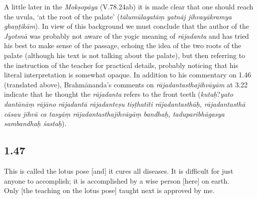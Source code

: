 \begin{ekdosis}
\begin{philcomm}[hp01_045]
A little later in the \emph{Mokṣopāya} (V.78.24ab) it is made clear that one should reach the uvula, `at the root of the palate' (\emph{tālumūlagatāṃ yatnāj jihvayākramya ghaṇṭikām}). In view of this background we must conclude that the author of the \emph{Jyotsnā} was probably not aware of the yogic meaning of \emph{rājadanta} and has tried his best to make sense of the passage,
echoing the idea of the two roots of the palate (although his text is not talking about the palate), but then referring to the instruction of the teacher for practical details, probably noticing that his literal interpretation is somewhat opaque. In addition to his commentary on 1.46 (translated above), Brahmānanda’s comments on \emph{rājadantasthajihvāyām} at 3.22 indicate that he thought the \emph{rājadanta} refers to the front teeth (\emph{kutaḥ}?\emph{yato dantānāṃ rājāno rājadantā rājadanteṣu tiṣṭhatīti rājadantasthāḥ, rājadantasthā cāsau jihvā ca tasyāṃ rājadantasthajihvāyāṃ bandhaḥ, taduparibhāgasya sambandhaḥ śastaḥ}).
\end{philcomm}





\subsection*{1.47}
\begin{translation}[hp01_047]
This is called the lotus pose [and] it cures all diseases. It is difficult for just anyone to accomplish; it is accomplished by a wise person [here] on earth.\\

Only [the teaching on the lotus pose] taught next is approved by me.  
\end{translation}


\end{ekdosis}
